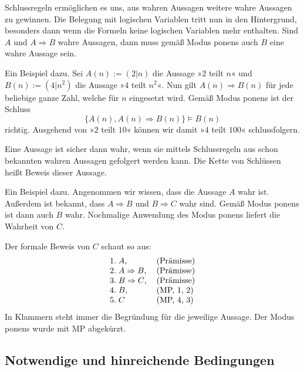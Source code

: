Schlussregeln ermöglichen es uns, aus wahren Aussagen weitere
wahre Aussagen zu gewinnen. Die Belegung mit logischen Variablen
tritt nun in den Hintergrund, besonders dann wenn die Formeln keine
logischen Variablen mehr enthalten. Sind $A$ und $A\Rightarrow B$
wahre Aussagen, dann muss gemäß Modus ponens auch $B$ eine wahre
Aussage sein.

Ein Beispiel dazu. Sei $A(n):=(2|n)$ die Aussage »$2$ teilt $n$«
und $B(n):=(4|n^2)$ die Aussage »$4$ teilt $n^2$«.
Nun gilt $A(n)\Rightarrow B(n)$ für jede beliebige ganze
Zahl, welche für $n$ eingesetzt wird. Gemäß Modus ponens ist der Schluss%
\[\{A(n), A(n)\Rightarrow B(n)\}\models B(n)\]
richtig. Ausgehend von »$2$ teilt $10$« können wir
damit »$4$ teilt $100$« schlussfolgern.

\begin{Definition}[Beweis]
Eine Aussage ist sicher dann wahr, wenn sie mittels Schlussregeln
aus schon bekannten wahren Aussagen gefolgert werden kann. Die Kette
von Schlüssen heißt Beweis dieser Aussage.
\end{Definition}
Ein Beispiel dazu. Angenommen wir wissen, dass die Aussage $A$ wahr
ist. Außerdem ist bekannt, dass $A\Rightarrow B$ und $B\Rightarrow C$
wahr sind. Gemäß Modus ponens ist dann auch $B$ wahr. Nochmalige
Anwendung des Modus ponens liefert die Wahrheit von $C$.

Der formale Beweis von $C$ schaut so aus:
\[
\begin{tabular}{ll}
1.\;$A$, & (Prämisse)\\
2.\;$A\Rightarrow B$, & (Prämisse)\\
3.\;$B\Rightarrow C$, & (Prämisse)\\
4.\;$B$, & (MP, 1, 2)\\
5.\;$C$ & (MP, 4, 3)
\end{tabular}
\]
In Klammern steht immer die Begründung für die jeweilige Aussage.
Der Modus ponens wurde mit MP abgekürzt.

\newpage
\subsection{Notwendige und hinreichende Bedingungen}

